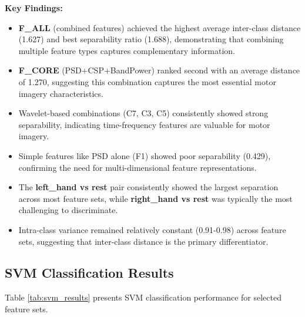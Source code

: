 \documentclass[conference]{IEEEtran}
\begin{document}
\textbf{Key Findings:}
\begin{itemize}
    \item \textbf{F\_ALL} (combined features) achieved the highest average inter-class distance (1.627) and best separability ratio (1.688), demonstrating that combining multiple feature types captures complementary information.
    
    \item \textbf{F\_CORE} (PSD+CSP+BandPower) ranked second with an average distance of 1.270, suggesting this combination captures the most essential motor imagery characteristics.
    
    \item Wavelet-based combinations (C7, C3, C5) consistently showed strong separability, indicating time-frequency features are valuable for motor imagery.
    
    \item Simple features like PSD alone (F1) showed poor separability (0.429), confirming the need for multi-dimensional feature representations.
    
    \item The \textbf{left\_hand vs rest} pair consistently showed the largest separation across most feature sets, while \textbf{right\_hand vs rest} was typically the most challenging to discriminate.
    
    \item Intra-class variance remained relatively constant (0.91-0.98) across feature sets, suggesting that inter-class distance is the primary differentiator.
\end{itemize}

\subsection{SVM Classification Results}

Table \ref{tab:svm_results} presents SVM classification performance for selected feature sets.
\end{document}
